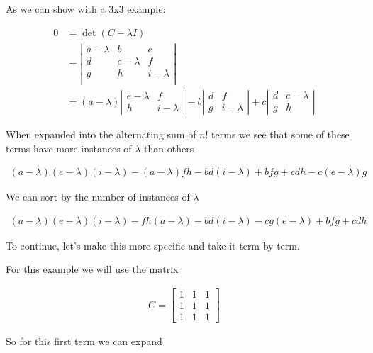 \documentclass[
  letterpaper,
  DIV=11,
  numbers=noendperiod]{scrartcl}
\begin{document}
As we can show with a 3x3 example:

\begin{align*}
0 &= \det(C - \lambda I) \\
&= \left|\begin{array}{ccc}
    a - \lambda & b & c \\
    d & e - \lambda & f \\
    g & h & i - \lambda \\
\end{array}\right| \\
&= (a - \lambda)\left|\begin{array}{cc}e - \lambda&f\\h&i - \lambda\end{array}\right| -
    b\left|\begin{array}{cc}d&f\\g&i - \lambda\end{array}\right| +
    c\left|\begin{array}{cc}d&e - \lambda\\g&h\end{array}\right|
\end{align*}

When expanded into the alternating sum of \(n!\) terms we see that some
of these terms have more instances of \(\lambda\) than others

\begin{align*}
(a - \lambda)(e - \lambda)(i - \lambda) - (a - \lambda)fh - bd(i - \lambda) + bfg + cdh - c(e - \lambda)g
\end{align*}

We can sort by the number of instances of \(\lambda\)

\begin{align*}
(a - \lambda)(e - \lambda)(i - \lambda) - fh(a - \lambda) - bd(i - \lambda) - cg(e - \lambda) + bfg + cdh
\end{align*}

To continue, let's make this more specific and take it term by term.

For this example we will use the matrix

\begin{align*}
C = \begin{bmatrix}1&1&1\\1&1&1\\1&1&1\end{bmatrix}
\end{align*}

So for this first term we can expand
\end{document}
